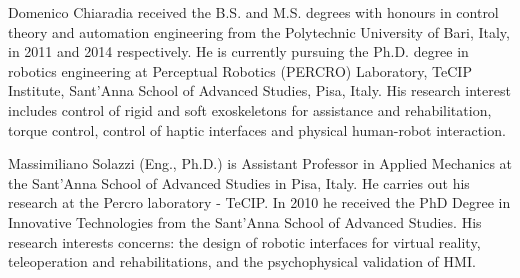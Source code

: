 \documentclass[journal]{IEEEtran}
\begin{document}
% 
\begin{IEEEbiography}{Domenico Chiaradia}
received the B.S. and M.S. degrees with honours in control theory and automation engineering from the Polytechnic University of Bari, Italy, in 2011 and 2014 respectively.  He is currently pursuing the Ph.D. degree in robotics engineering at Perceptual Robotics (PERCRO) Laboratory, TeCIP Institute, Sant'Anna School of Advanced Studies, Pisa, Italy.
His research interest includes control of rigid and soft exoskeletons for assistance and rehabilitation, torque control, control of haptic interfaces and physical human-robot interaction.
%
\end{IEEEbiography}

\begin{IEEEbiography}{Massimiliano Solazzi} (Eng., Ph.D.) is Assistant Professor in Applied Mechanics at the Sant'Anna School of Advanced Studies in Pisa, Italy. He carries out his research at the Percro laboratory - TeCIP.  In 2010 he received the PhD Degree in Innovative Technologies from the Sant'Anna School of Advanced Studies. 
His research interests concerns: the design of robotic interfaces for virtual reality, teleoperation and rehabilitations, and the psychophysical validation of HMI.
\end{IEEEbiography}
\end{document}
